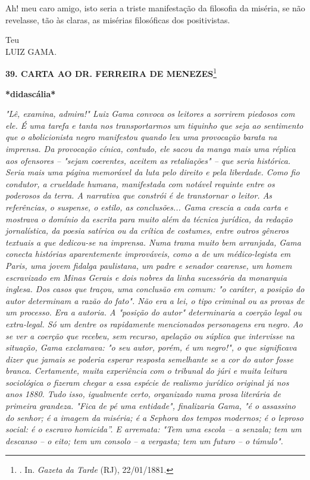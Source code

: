 Ah! meu caro amigo, isto seria a triste manifestação da filosofia da
miséria, se não revelasse, tão às claras, as misérias filosóficas dos
positivistas.

Teu\\
LUIZ GAMA.

\textbf{39. CARTA AO DR. FERREIRA DE MENEZES}\footnote{. In.
  \emph{Gazeta da Tarde} (RJ), 22/01/1881.}

\textbf{*didascália*}

\emph{"Lê, examina, admira!" Luiz Gama convoca os leitores a sorrirem
piedosos com ele. É uma tarefa e tanta nos transportarmos um tiquinho
que seja ao sentimento que o abolicionista negro manifestou quando leu
uma provocação barata na imprensa. Da provocação cínica, contudo, ele
sacou da manga mais uma réplica aos ofensores -- "sejam coerentes,
aceitem as retaliações" -- que seria histórica. Seria mais uma página
memorável da luta pelo direito e pela liberdade. Como fio condutor, a
crueldade humana, manifestada com notável requinte entre os poderosos da
terra. A narrativa que constrói é de transtornar o leitor. As
referências, o suspense, o estilo, as conclusões... Gama crescia a cada
carta e mostrava o domínio da escrita para muito além da técnica
jurídica, da redação jornalística, da poesia satírica ou da crítica de
costumes, entre outros gêneros textuais a que dedicou-se na imprensa.
Numa trama muito bem arranjada, Gama conecta histórias aparentemente
improváveis, como a de um médico-legista em Paris, uma jovem fidalga
paulistana, um padre e senador cearense, um homem escravizado em Minas
Gerais e dois nobres da linha sucessória da monarquia inglesa. Dos casos
que traçou, uma conclusão em comum: "o caráter, a posição do autor
determinam a razão do fato". Não era a lei, o tipo criminal ou as provas
de um processo. Era a autoria. A "posição do autor" determinaria a
coerção legal ou extra-legal. Só um dentre os rapidamente mencionados
personagens era negro. Ao se ver a coerção que recebeu, sem recurso,
apelação ou súplica que intervisse na situação, Gama exclamava: "o seu
autor, porém, é um negro!", o que significava dizer que jamais se
poderia esperar resposta semelhante se a cor do autor fosse branca.
Certamente, muita experiência com o tribunal do júri e muita leitura
sociológica o fizeram chegar a essa espécie de realismo jurídico
original já nos anos 1880. Tudo isso, igualmente certo, organizado numa
prosa literária de primeira grandeza. "Fica de pé uma entidade",
finalizaria Gama, "é o assassino do senhor; é a imagem da miséria; é a
Sephora dos tempos modernos; é o leproso social: é o escravo homicida''.
E arremata: "Tem uma escola -- a senzala; tem um descanso -- o eito; tem
um consolo -- a vergasta; tem um futuro -- o túmulo". }

